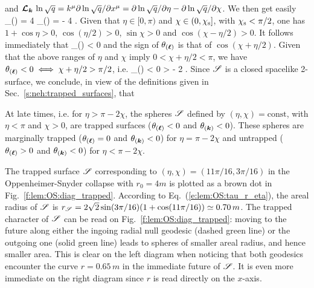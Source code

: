  and
 $\bm{\mathcal{L}}_{\bm{\bm{k}}}\, \ln \sqrt{q} = k^\mu \partial \ln\sqrt{q} /\partial x^\mu =
 \partial \ln\sqrt{q} /\partial \eta - \partial\ln  \sqrt{q} /\partial \chi$.
We then get easily
\be
    \theta_{(\wl)} = 4 
    \qand
    \theta_{()} = - 4  .
\ee
Given that $\eta\in [0,\pi)$ %
and $\chi\in(0,\chi_{\rm s}]$, with $\chi_{\rm s} < \pi/2$,
one has $1 + \cos\eta > 0$, $\cos(\eta/2) > 0$, $\sin\chi > 0$
and $\cos(\chi - \eta/2) > 0$. It follows immediately that
\be
    \theta_{()} < 0
\ee
and the sign of $\theta_{(\bm{\ell})}$ is that of $\cos(\chi + \eta/2)$.
Given that the above ranges of $\eta$ and $\chi$ imply $0 < \chi + \eta/2 < \pi$,
we have $\theta_{(\bm{\ell})} < 0 \iff \chi + \eta/2 > \pi/2$, i.e.
\be \label{e:lem:theta_l_neg}
    \theta_{(\wl)} < 0 \iff \eta > \pi - 2 \chi .
\ee
Since $\mathscr{S}$ is a closed spacelike 2-surface,
we conclude, in view of the definitions given in Sec.~\ref{s:neh:trapped_surfaces}, that
\begin{greybox}
At late times, i.e. for $\eta > \pi - 2 \chi$, the spheres $\mathscr{S}$ defined
by $(\eta,\chi) = \mathrm{const}$, with $\eta<\pi$ and $\chi>0$,
are trapped surfaces ($\theta_{(\bm{\ell})} < 0$ and $\theta_{(\bm{k})} < 0$).
These spheres are marginally trapped
($\theta_{(\bm{\ell})} = 0$ and $\theta_{(\bm{k})} < 0$)
for $\eta = \pi - 2 \chi$
and untrapped ($\theta_{(\bm{\ell})} > 0$ and $\theta_{(\bm{k})} < 0$) for $\eta <  \pi - 2 \chi$.
\end{greybox}

\begin{example}
The trapped surface $\mathscr{S}$ corresponding to $(\eta,\chi) = (11\pi/16, 3\pi/16)$
in the Oppen\-heimer-Snyder collapse with $r_0 = 4 m$
is plotted as a brown dot in Fig.~\ref{f:lem:OS:diag_trapped}. According
to Eq.~(\ref{e:lem:OS:tau_r_eta}), the areal radius of $\mathscr{S}$ is
$r_{\mathscr{S}} = 2\sqrt{2} \sin(3\pi/16) (1 + \cos(11\pi/16)) \simeq 0.70\, m$.
The trapped character of $\mathscr{S}$ can be read on Fig.~\ref{f:lem:OS:diag_trapped}:
moving to the future along either the ingoing radial null geodesic (dashed green line)
or the outgoing one (solid green line) leads to spheres of smaller areal radius,
and hence smaller area. This is clear on the left diagram when noticing
that both geodesics encounter the curve $r=0.65\, m$ in the immediate future of $\mathscr{S}$.
It is even more immediate on the right diagram since $r$ is read directly on the $x$-axis.
\end{example}

